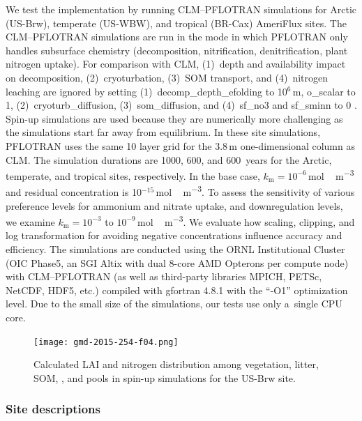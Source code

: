 \documentclass[gmd,noline]{copernicus}
\begin{document}
      We test the implementation by running CLM--PFLOTRAN simulations for
      Arctic (US-Brw), temperate (US-WBW), and tropical (BR-Cax) AmeriFlux
      sites. The CLM--PFLOTRAN simulations are run in the mode in which
      PFLOTRAN only handles subsurface chemistry (decomposition,
      nitrification, denitrification, plant nitrogen uptake). For comparison
      with CLM, (1)~depth and  availability impact on
      decomposition, (2)~cryoturbation, (3)~SOM transport, and (4)~nitrogen
      leaching are ignored by setting (1)~decomp\_depth\_efolding to
      10$^6$\,m, o\_scalar to 1, (2)~cryoturb\_diffusion,
      (3)~som\_diffusion, and (4)~sf\_no3 and sf\_sminn to 0
      \citep{Oleson2013}. Spin-up simulations are used because they are
      numerically more challenging as the simulations start far away from
      equilibrium. In these site simulations, PFLOTRAN uses the same 10
      layer grid for the 3.8\,m one-dimensional column as CLM. The
      simulation durations are 1000, 600, and 600~years for the Arctic,
      temperate, and tropical sites, respectively.  In the base case,
      $k_\mathrm{m}=10^{-6}$\,\unit{mol\,m^{-3}} and residual concentration
      is 10$^{-15}$\,\unit{mol\,m^{-3}}. To assess the sensitivity of
      various preference levels for ammonium and nitrate uptake, and
      downregulation levels, we examine $k_\mathrm{m}=10^{-3}$ to
      $10^{-9}$\,\unit{mol\,m^{-3}}. We evaluate how scaling, clipping, and
      log transformation for avoiding negative concentrations influence
      accuracy and efficiency.  The simulations are conducted using the ORNL
      Institutional Cluster (OIC Phase5, an SGI Altix with dual 8-core AMD
      Opterons per compute node) with CLM--PFLOTRAN (as well as third-party
      libraries MPICH, PETSc, NetCDF, HDF5, etc.) compiled with gfortran
      4.8.1 with the ``-O1'' optimization level.  Due to the small size of
      the simulations, our tests use only a~single CPU core.

\begin{figure}[t]
\texttt{[image: gmd-2015-254-f04.png]}
\caption{Calculated LAI and nitrogen distribution among vegetation, litter,
SOM, , and  pools in spin-up simulations for the
US-Brw site.} \label{fig:brw500yl}
\end{figure}


\subsubsection{Site descriptions}%
\end{document}
